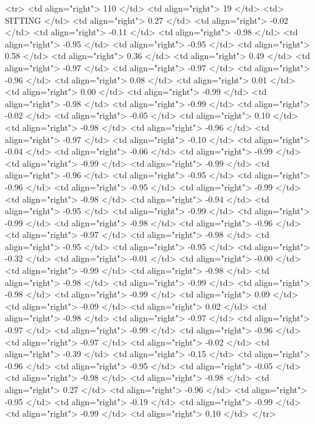   <tr> <td align="right"> 110 </td> <td align="right">  19 </td> <td> SITTING </td> <td align="right"> 0.27 </td> <td align="right"> -0.02 </td> <td align="right"> -0.11 </td> <td align="right"> -0.98 </td> <td align="right"> -0.95 </td> <td align="right"> -0.95 </td> <td align="right"> 0.58 </td> <td align="right"> 0.36 </td> <td align="right"> 0.49 </td> <td align="right"> -0.97 </td> <td align="right"> -0.97 </td> <td align="right"> -0.96 </td> <td align="right"> 0.08 </td> <td align="right"> 0.01 </td> <td align="right"> 0.00 </td> <td align="right"> -0.99 </td> <td align="right"> -0.98 </td> <td align="right"> -0.99 </td> <td align="right"> -0.02 </td> <td align="right"> -0.05 </td> <td align="right"> 0.10 </td> <td align="right"> -0.98 </td> <td align="right"> -0.96 </td> <td align="right"> -0.97 </td> <td align="right"> -0.10 </td> <td align="right"> -0.04 </td> <td align="right"> -0.06 </td> <td align="right"> -0.99 </td> <td align="right"> -0.99 </td> <td align="right"> -0.99 </td> <td align="right"> -0.96 </td> <td align="right"> -0.95 </td> <td align="right"> -0.96 </td> <td align="right"> -0.95 </td> <td align="right"> -0.99 </td> <td align="right"> -0.98 </td> <td align="right"> -0.94 </td> <td align="right"> -0.95 </td> <td align="right"> -0.99 </td> <td align="right"> -0.99 </td> <td align="right"> -0.98 </td> <td align="right"> -0.96 </td> <td align="right"> -0.97 </td> <td align="right"> -0.98 </td> <td align="right"> -0.95 </td> <td align="right"> -0.95 </td> <td align="right"> -0.32 </td> <td align="right"> -0.01 </td> <td align="right"> -0.00 </td> <td align="right"> -0.99 </td> <td align="right"> -0.98 </td> <td align="right"> -0.98 </td> <td align="right"> -0.99 </td> <td align="right"> -0.98 </td> <td align="right"> -0.99 </td> <td align="right"> 0.09 </td> <td align="right"> -0.09 </td> <td align="right"> 0.02 </td> <td align="right"> -0.98 </td> <td align="right"> -0.97 </td> <td align="right"> -0.97 </td> <td align="right"> -0.99 </td> <td align="right"> -0.96 </td> <td align="right"> -0.97 </td> <td align="right"> -0.02 </td> <td align="right"> -0.39 </td> <td align="right"> -0.15 </td> <td align="right"> -0.96 </td> <td align="right"> -0.95 </td> <td align="right"> -0.05 </td> <td align="right"> -0.98 </td> <td align="right"> -0.98 </td> <td align="right"> 0.27 </td> <td align="right"> -0.96 </td> <td align="right"> -0.95 </td> <td align="right"> -0.19 </td> <td align="right"> -0.99 </td> <td align="right"> -0.99 </td> <td align="right"> 0.10 </td> </tr>
